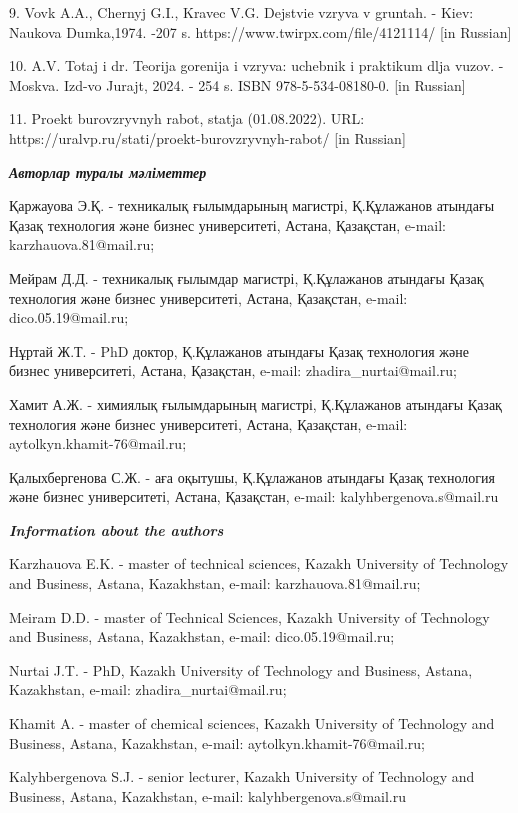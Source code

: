 9. Vovk A.A., Chernyj G.I., Kravec V.G. Dejstvie vzryva v gruntah. -
Kiev: Naukova Dumka,1974. -207 s. https://www.twirpx.com/file/4121114/
{[}in Russian{]}

10. A.V. Totaj i dr. Teorija gorenija i vzryva: uchebnik i praktikum
dlja vuzov. -Moskva. Izd-vo Jurajt, 2024. - 254 s. ISBN
978-5-534-08180-0. {[}in Russian{]}

11. Proekt burovzryvnyh rabot, stat\textquotesingle ja (01.08.2022).
URL: https://uralvp.ru/stati/proekt-burovzryvnyh-rabot/ {[}in Russian{]}

\emph{{\bfseries Авторлар туралы мәліметтер}}

Қаржауова Э.Қ. - техникалық ғылымдарының магистрі, Қ.Құлажанов атындағы
Қазақ технология және бизнес университеті, Астана, Қазақстан, e-mail:
karzhauova.81@mail.ru;

Мейрам Д.Д. - техникалық ғылымдар магистрі, Қ.Құлажанов атындағы Қазақ
технология және бизнес университеті, Астана, Қазақстан, e-mail:
dico.05.19@mail.ru;

Нұртай Ж.Т. - PhD доктор, Қ.Құлажанов атындағы Қазақ технология және
бизнес университеті, Астана, Қазақстан, e-mail: zhadira\_nurtai@mail.ru;

Хамит А.Ж. - химиялық ғылымдарының магистрі, Қ.Құлажанов атындағы Қазақ
технология және бизнес университеті, Астана, Қазақстан, e-mail:
aytolkyn.khamit-76@mail.ru;

Қалыхбергенова С.Ж. - аға оқытушы, Қ.Құлажанов атындағы Қазақ технология
және бизнес университеті, Астана, Қазақстан, e-mail:
kalyhbergenova.s@mail.ru

\emph{{\bfseries Information about the authors}}

Karzhauova E.K. - master of technical sciences, Kazakh University of
Technology and Business, Astana, Kazakhstan, e-mail:
karzhauova.81@mail.ru;

Meiram D.D. - master of Technical Sciences, Kazakh University of
Technology and Business, Astana, Kazakhstan, e-mail: dico.05.19@mail.ru;

Nurtai J.T. - PhD, Kazakh University of Technology and Business, Astana,
Kazakhstan, e-mail: zhadira\_nurtai@mail.ru;

Khamit A. - master of chemical sciences, Kazakh University of Technology
and Business, Astana, Kazakhstan, e-mail: aytolkyn.khamit-76@mail.ru;

Kalyhbergenova S.J. - senior lecturer, Kazakh University of Technology
and Business, Astana, Kazakhstan, e-mail: kalyhbergenova.s@mail.ru
